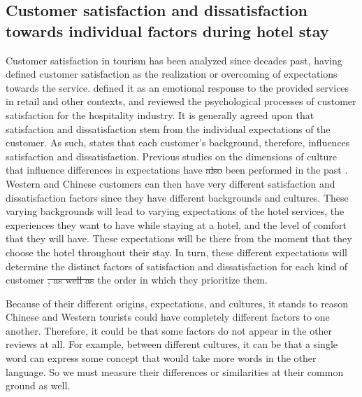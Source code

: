 \documentclass[smallextended,natbib]{svjour3}       %
\providecommand{\DIFadd}[1]{{\protect\color{blue}\uwave{#1}}} %
\providecommand{\DIFdel}[1]{{\protect\color{red}\sout{#1}}}                      %
\providecommand{\DIFaddbegin}{} %
\providecommand{\DIFaddend}{} %
\providecommand{\DIFdelbegin}{} %
\providecommand{\DIFdelend}{} %
\newcommand{\DIFscaledelfig}{0.5}
\newlength{\DIFdelgraphicswidth} %
\newlength{\DIFdelgraphicsheight} %
\newcommand{\DIFaddincludegraphics}[2][]{{\color{blue}\fbox{\DIFOincludegraphics[#1]{#2}}}} %
\newcommand{\DIFdelincludegraphics}[2][]{%
\sbox{\DIFdelgraphicsbox}{\DIFOincludegraphics[#1]{#2}}%
\settoboxwidth{\DIFdelgraphicswidth}{\DIFdelgraphicsbox} %
\settoboxtotalheight{\DIFdelgraphicsheight}{\DIFdelgraphicsbox} %
\scalebox{\DIFscaledelfig}{%
\parbox[b]{\DIFdelgraphicswidth}{\usebox{\DIFdelgraphicsbox}\\[-\baselineskip] \rule{\DIFdelgraphicswidth}{0em}}\llap{\resizebox{\DIFdelgraphicswidth}{\DIFdelgraphicsheight}{%
\setlength{\unitlength}{\DIFdelgraphicswidth}%
\begin{picture}(1,1)%
\thicklines\linethickness{2pt} %
{\color[rgb]{1,0,0}\put(0,0){\framebox(1,1){}}}%
{\color[rgb]{1,0,0}\put(0,0){\line( 1,1){1}}}%
{\color[rgb]{1,0,0}\put(0,1){\line(1,-1){1}}}%
\end{picture}%
}\hspace*{3pt}}} %
} %
\DeclareRobustCommand{\DIFaddbegin}{\DIFOaddbegin \let\includegraphics\DIFaddincludegraphics} %
\DeclareRobustCommand{\DIFaddend}{\DIFOaddend \let\includegraphics\DIFOincludegraphics} %
\DeclareRobustCommand{\DIFdelbegin}{\DIFOdelbegin \let\includegraphics\DIFdelincludegraphics} %
\DeclareRobustCommand{\DIFdelend}{\DIFOaddend \let\includegraphics\DIFOincludegraphics} %
\begin{document}
  \subsection{Customer satisfaction and dissatisfaction towards individual factors during hotel stay}\label{theory_satisfaction}

    Customer satisfaction in tourism has been analyzed since decades past, \cite{hunt1975} having defined customer satisfaction as the realization or overcoming of expectations towards the service. \cite{oliver1981} defined it as an emotional response to the provided services in retail and other contexts, and \cite{oh1996} reviewed the psychological processes of customer satisfaction for the hospitality industry. It is generally agreed upon that satisfaction and dissatisfaction stem from the individual expectations of the customer. As such, \cite{engel1990} states that each customer's background, therefore, influences satisfaction and dissatisfaction. Previous studies on the dimensions of culture that influence differences in expectations have \DIFdelbegin \DIFdel{also }\DIFdelend been performed in the past \cite{donthu1998cultural}. Western and Chinese customers can then have very different satisfaction and dissatisfaction factors since they have different backgrounds and cultures. These varying backgrounds will lead to varying expectations of the hotel services, the experiences they want to have while staying at a hotel, and the level of comfort that they will have. These expectations will be there from the moment that they choose the hotel throughout their stay. In turn, these different expectations will determine the distinct factors of satisfaction and dissatisfaction for each kind of customer \DIFdelbegin \DIFdel{, as well as }\DIFdelend \DIFaddbegin \DIFadd{and }\DIFaddend the order in which they prioritize them. 

    Because of their different origins, expectations, and cultures, it stands to reason Chinese and Western tourists could have completely different factors to one another. Therefore, it could be that some factors do not appear in the other reviews at all. For example, between different cultures, it can be that a single word can express some concept that would take more words in the other language. So we must measure their differences or similarities at their common ground as well.
\end{document}
